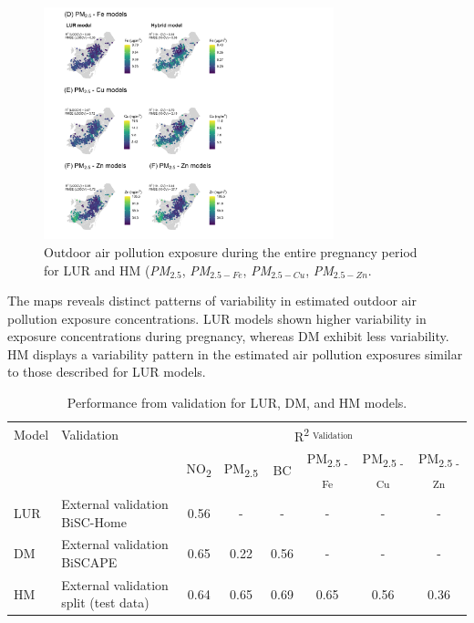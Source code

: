 \documentclass{article}
\begin{document}
\begin{figure}[!h]
\includegraphics[width=0.75\textwidth]{figures/combined_figure2_v3.png}
\caption{Outdoor air pollution exposure during the entire pregnancy period for LUR and HM (\textit{PM$_{2.5}$}, \textit{PM$_{2.5-Fe}$}, \textit{PM$_{2.5-Cu}$}, \textit{PM$_{2.5-Zn}$}.}
\label{fig3}
\end{figure}

The maps reveals distinct patterns of variability in estimated outdoor air pollution exposure concentrations. LUR models shown higher variability in exposure concentrations during pregnancy, whereas DM exhibit less variability. HM displays a variability pattern in the estimated air pollution exposures similar to those described for LUR models.

\begin{table}[h!]
\centering
    \caption{Performance from validation for LUR, DM, and HM models.}
    \label{table2}
    \begin{tabular}{llcccccc}
    \toprule
         Model & Validation & \multicolumn{6}{c}{R\textsuperscript{2 \textsubscript{ Validation}}} \\
         \cmidrule(lr){3-8}
         & & NO\textsubscript{2} & PM\textsubscript{2.5} & BC & PM\textsubscript{2.5 - Fe} & PM\textsubscript{2.5 - Cu} & PM\textsubscript{2.5 - Zn} \\
    \midrule
         LUR & External validation BiSC-Home & 0.56 & - & - & - & - & - \\
         DM & External validation BiSCAPE & 0.65 & 0.22 & 0.56 & - & - & - \\
         HM & External validation split (test data) & 0.64 & 0.65 & 0.69 & 0.65 & 0.56 & 0.36  \\
    \bottomrule
    \end{tabular}
\end{table}
\end{document}
